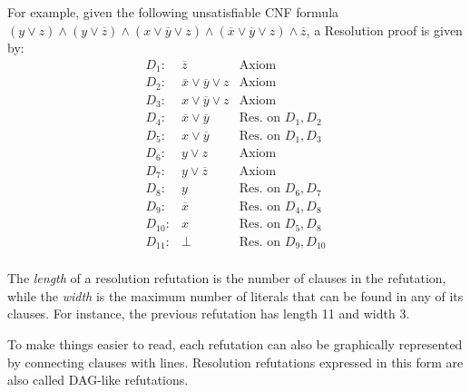 For example, given the following unsatisfiable CNF formula $(y \lor z) \land (y \lor \overline{z}) \land (x \lor \overline{y} \lor z) \land (\overline{x} \lor \overline{y} \lor z) \land \overline{z}$, a Resolution proof is given by:
\[\begin{array}{lcl}
    D_1 :& \overline{z} & \text{Axiom} \\
    D_2 :& \overline{x} \lor \overline{y} \lor z & \text{Axiom} \\
    D_3 :& x \lor \overline{y} \lor z & \text{Axiom} \\
    D_4 :& \overline{x} \lor \overline{y} & \text{Res. on $D_1, D_2$} \\
    D_5 :& x \lor \overline{y} & \text{Res. on $D_1, D_3$} \\
    D_6 :& y \lor z & \text{Axiom} \\
    D_7 :& y \lor \overline{z} & \text{Axiom} \\
    D_8 :& y & \text{Res. on $D_6,D_7$} \\
    D_9 :& \overline{x} & \text{Res. on $D_4, D_8$} \\
    D_{10} :& x & \text{Res. on $D_5, D_8$} \\
    D_{11} :& \bot & \text{Res. on $D_9, D_10$} \\
\end{array}\]
\noindent

The \textit{length} of a resolution refutation is the number of clauses in the refutation, while the \textit{width} is the maximum number of literals that can be found in any of its clauses. For instance, the previous refutation has length 11 and width 3.

To make things easier to read, each refutation can also be graphically represented by connecting clauses with lines. Resolution refutations expressed in this form are also called DAG-like refutations.

